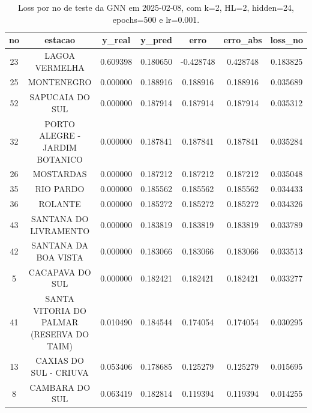 \begin{table}[h]
\centering
\caption{Loss por no de teste da GNN em 2025-02-08, com k=2, HL=2, hidden=24, epochs=500 e lr=0.001.}
\label{tab:gnn_loss_k2_hl2_h24_e500_d20250208}
\begin{tabular}{ccccccc}
\toprule
no & estacao & y\_real & y\_pred & erro & erro\_abs & loss\_no \\
\midrule
23 & LAGOA VERMELHA & 0.609398 & 0.180650 & -0.428748 & 0.428748 & 0.183825 \\
25 & MONTENEGRO & 0.000000 & 0.188916 & 0.188916 & 0.188916 & 0.035689 \\
52 & SAPUCAIA DO SUL & 0.000000 & 0.187914 & 0.187914 & 0.187914 & 0.035312 \\
32 & PORTO ALEGRE - JARDIM BOTANICO & 0.000000 & 0.187841 & 0.187841 & 0.187841 & 0.035284 \\
26 & MOSTARDAS & 0.000000 & 0.187212 & 0.187212 & 0.187212 & 0.035048 \\
35 & RIO PARDO & 0.000000 & 0.185562 & 0.185562 & 0.185562 & 0.034433 \\
36 & ROLANTE & 0.000000 & 0.185272 & 0.185272 & 0.185272 & 0.034326 \\
43 & SANTANA DO LIVRAMENTO & 0.000000 & 0.183819 & 0.183819 & 0.183819 & 0.033789 \\
42 & SANTANA DA BOA VISTA & 0.000000 & 0.183066 & 0.183066 & 0.183066 & 0.033513 \\
5 & CACAPAVA DO SUL & 0.000000 & 0.182421 & 0.182421 & 0.182421 & 0.033277 \\
41 & SANTA VITORIA DO PALMAR (RESERVA DO TAIM) & 0.010490 & 0.184544 & 0.174054 & 0.174054 & 0.030295 \\
13 & CAXIAS DO SUL - CRIUVA & 0.053406 & 0.178685 & 0.125279 & 0.125279 & 0.015695 \\
8 & CAMBARA DO SUL & 0.063419 & 0.182814 & 0.119394 & 0.119394 & 0.014255 \\
\bottomrule
\end{tabular}
\end{table}
